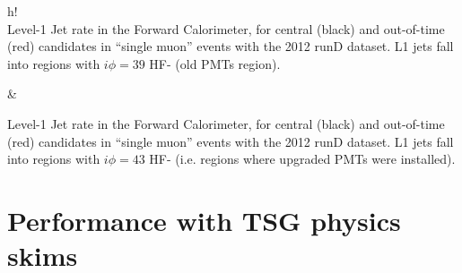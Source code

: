 \documentclass[11pt]{cmspaperpdf}
\begin{document}
\begin{2figures}{h!}
 \\
\caption{Level-1 Jet rate in the Forward Calorimeter, for central (black) and out-of-time (red) candidates in ``single muon'' events with the 2012 runD dataset. L1 jets fall into regions with $i \phi=39$ HF- (old PMTs region).}\label{fig:oldpmts} &
\caption{Level-1 Jet rate in the Forward Calorimeter, for central (black) and out-of-time (red) candidates in ``single muon'' events with the 2012 runD dataset. L1 jets fall into regions with $i \phi=43$ HF- (i.e. regions where upgraded PMTs were installed).}\label{fig:newpmts}
\end{2figures}

\newpage
\section{Performance with TSG physics skims}
\end{document}
